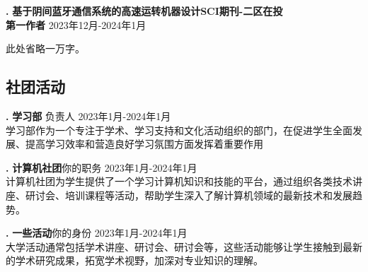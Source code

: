 \documentclass[10pt]{article}
\begin{document}
    \vspace{1em}                %


    \textbf{\uppercase\expandafter{}.} \textbf{基于阴间蓝牙通信系统的高速运转机器设计\hfill SCI期刊-二区在投}\\
    \textbf{第一作者} \hfill 2023年12月-2024年1月
    
    此处省略一万字。


    \subsection{\Large 社团活动}
    \textbf{\uppercase\expandafter{}.} \textbf{学习部}\hspace{1em} 负责人 \hfill 2023年1月-2024年1月\\

    学习部作为一个专注于学术、学习支持和文化活动组织的部门，在促进学生全面发展、提高学习效率和营造良好学习氛围方面发挥着重要作用
    
    \vspace{1em}

    
    \textbf{\uppercase\expandafter{}.} \textbf{计算机社团}\hspace{1em}你的职务 \hfill 2023年1月-2024年1月\\

    计算机社团为学生提供了一个学习计算机知识和技能的平台，通过组织各类技术讲座、研讨会、培训课程等活动，帮助学生深入了解计算机领域的最新技术和发展趋势。
    
    \vspace{1em}

    
    \textbf{\uppercase\expandafter{}.} \textbf{一些活动}\hspace{1em}你的身份 \hfill 2023年1月-2024年1月\\ 

    大学活动通常包括学术讲座、研讨会、研讨会等，这些活动能够让学生接触到最新的学术研究成果，拓宽学术视野，加深对专业知识的理解。


    
\end{document}
